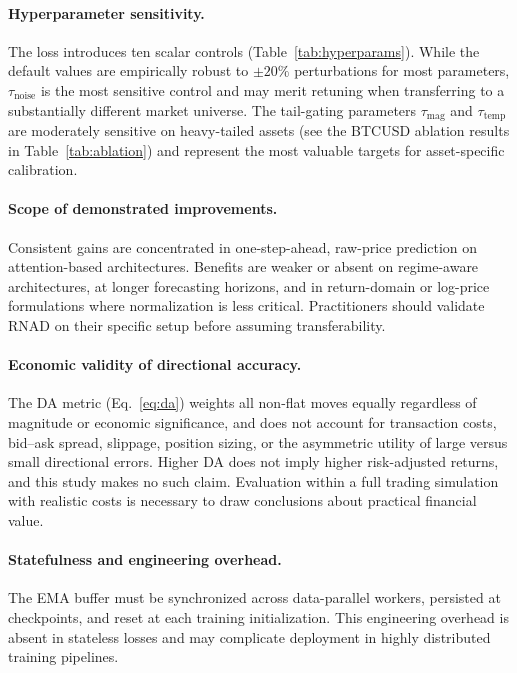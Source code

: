 \documentclass[11pt]{article}
\newcommand{\RNAD}{RNAD\xspace}
\begin{document}
\paragraph{Hyperparameter sensitivity.}
The loss introduces ten scalar controls (Table~\ref{tab:hyperparams}).
While the default values are empirically robust to $\pm 20\%$
perturbations for most parameters, $\tau_{\mathrm{noise}}$ is the
most sensitive control and may merit retuning when transferring to a
substantially different market universe. The tail-gating parameters
$\tau_{\mathrm{mag}}$ and $\tau_{\mathrm{temp}}$ are moderately
sensitive on heavy-tailed assets (see the BTCUSD ablation results
in Table~\ref{tab:ablation}) and represent the most valuable targets
for asset-specific calibration.

\paragraph{Scope of demonstrated improvements.}
Consistent gains are concentrated in one-step-ahead, raw-price
prediction on attention-based architectures. Benefits are weaker
or absent on regime-aware architectures, at longer forecasting
horizons, and in return-domain or log-price formulations where
normalization is less critical. Practitioners should validate \RNAD
on their specific setup before assuming transferability.

\paragraph{Economic validity of directional accuracy.}
The DA metric (Eq.~\ref{eq:da}) weights all non-flat moves equally
regardless of magnitude or economic significance, and does not account
for transaction costs, bid--ask spread, slippage, position sizing,
or the asymmetric utility of large versus small directional errors.
Higher DA does not imply higher risk-adjusted returns, and this study
makes no such claim. Evaluation within a full trading simulation with
realistic costs is necessary to draw conclusions about practical
financial value.

\paragraph{Statefulness and engineering overhead.}
The EMA buffer must be synchronized across data-parallel workers,
persisted at checkpoints, and reset at each training initialization.
This engineering overhead is absent in stateless losses and may
complicate deployment in highly distributed training pipelines.
\end{document}
